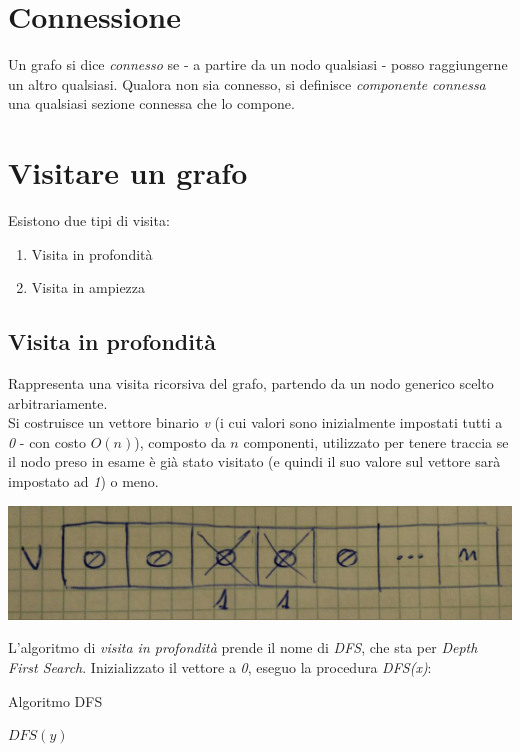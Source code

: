 \section{Connessione}
Un grafo si dice \textit{connesso} se - a partire da un nodo qualsiasi - posso raggiungerne un altro qualsiasi.
Qualora non sia connesso, si definisce \textit{componente connessa} una qualsiasi sezione connessa che lo compone.

\section{Visitare un grafo}
Esistono due tipi di visita:
\begin{enumerate}
    \item Visita in profondità
    \item Visita in ampiezza
\end{enumerate}

\subsection{Visita in profondità}
Rappresenta una visita ricorsiva del grafo, partendo da un nodo generico scelto arbitrariamente. \\
Si costruisce un vettore binario \textit{v} (i cui valori sono inizialmente impostati tutti a \textit{0} - con costo $O(n)$), composto da $n$ componenti, utilizzato per tenere traccia se il nodo preso in esame è già stato visitato (e quindi il suo valore sul vettore sarà impostato ad \textit{1}) o meno. \\
\begin{center}
    \includegraphics[width=.8\textwidth]{res/vettore-visita.jpg} \hfill
\end{center}
\newpage

L'algoritmo di \textit{visita in profondità} prende il nome di \textit{DFS}, che sta per \textit{Depth First Search}.
Inizializzato il vettore a \textit{0}, eseguo la procedura \textit{DFS(x)}:
\begin{algorithm}
	\caption{Algoritmo DFS}\label{alg:dfs}
	\begin{algorithmic}[1]
			 
			  
					\State $DFS(y)$
				\EndIf
			\EndFor
		\EndFunction
	\end{algorithmic}
\end{algorithm} \hfill \\

